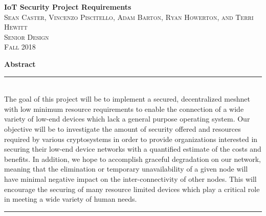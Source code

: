 \documentclass[tikz,a4paper,titlepage]{article}
\begin{document}
\begin{titlepage}
\vspace*{\fill}

\newcommand{\HRule}{\rule{\linewidth}{0.5mm}} %

\center %


{ \huge \bfseries IoT Security Project Requirements}\\[0.4cm] %


\textsc{\LARGE Sean Caster, Vincenzo Piscitello, Adam Barton, Ryan Howerton, and Terri Hewitt}\\[0.5cm] %
\textsc{\Large Senior Design}\\[0.5cm] %
\textsc{\large Fall 2018}\\[2.5cm] %


\begin{minipage}{0.8\textwidth}  %
\textbf{\large Abstract} \\
\HRule \\[0.4cm]
The goal of this project will be to implement a secured, decentralized meshnet with low minimum resource requirements to enable the connection of a wide variety of low-end devices which lack a general purpose operating system. Our objective will be to investigate the amount of security offered and resources required by various cryptosystems in order to provide organizations interested in securing their low-end device networks with a quantified estimate of the costs and benefits. In addition, we hope to accomplish graceful degradation on our network, meaning that the elimination or temporary unavailability of a given node will have minimal negative impact on the inter-connectivity of other nodes. This will encourage the securing of many resource limited devices which play a critical role in meeting a wide variety of human needs.
\\[0.4cm]
\HRule \\[1.5cm]
\end{minipage}


\end{titlepage}
\end{document}
